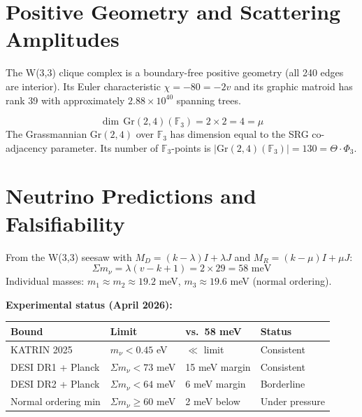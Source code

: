 \section{Positive Geometry and Scattering Amplitudes}
\label{sec:positive-geom}

\begin{theorem}
\label{thm:positive}
The W(3,3) clique complex is a boundary-free positive geometry
(all 240 edges are interior). Its Euler characteristic
$\chi = -80 = -2v$ and its graphic matroid has rank 39 with
approximately $2.88\times 10^{40}$ spanning trees.
\end{theorem}

\begin{theorem}[Grassmannian Dimension = $\mu$]
\begin{equation}
\dim\,\mathrm{Gr}(2,4)(\mathbb{F}_3) = 2\times 2 = 4 = \mu
\end{equation}
The Grassmannian $\mathrm{Gr}(2,4)$ over $\mathbb{F}_3$ has dimension
equal to the SRG co-adjacency parameter.
Its number of $\mathbb{F}_3$-points is
$|\mathrm{Gr}(2,4)(\mathbb{F}_3)| = 130 = \Theta\cdot\Phi_3$.
\end{theorem}


\section{Neutrino Predictions and Falsifiability}
\label{sec:neutrino-falsify}

\begin{theorem}
From the W(3,3) seesaw with $M_D = (k-\lambda)I + \lambda J$ and
$M_R = (k-\mu)I + \mu J$:
\begin{equation}
\boxed{\Sigma m_\nu = \lambda(v-k+1) = 2\times 29 = 58\text{ meV}}
\end{equation}
Individual masses: $m_1 \approx m_2 \approx 19.2$ meV,
$m_3 \approx 19.6$ meV (normal ordering).
\end{theorem}

\noindent\textbf{Experimental status (April 2026):}
\begin{center}
\small
\begin{tabular}{@{}llll@{}}
\toprule
\textbf{Bound} & \textbf{Limit} & \textbf{vs.\ 58 meV} & \textbf{Status} \\
\midrule
KATRIN 2025 & $m_\nu < 0.45$ eV & $\ll$ limit & Consistent \\
DESI DR1 + Planck & $\Sigma m_\nu < 73$ meV & 15 meV margin & Consistent \\
DESI DR2 + Planck & $\Sigma m_\nu < 64$ meV & 6 meV margin & Borderline \\
Normal ordering min & $\Sigma m_\nu \geq 60$ meV & 2 meV below & Under pressure \\
\bottomrule
\end{tabular}
\end{center}

